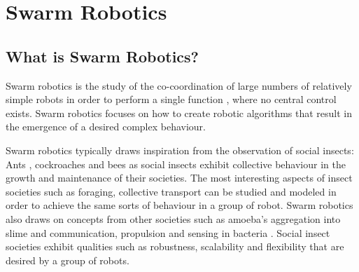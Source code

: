 
\chapter{Swarm Robotics}
\label{chap:first}





\section{What is Swarm Robotics?}
\label{sec:first:definitionswarmrobotics}

Swarm robotics is the study of the co-coordination of large numbers of relatively simple robots in order to perform a single function \cite{csahin2005swarm}, where no central control exists. Swarm robotics focuses on how to create robotic algorithms that result in the emergence of a desired complex behaviour.

Swarm robotics typically draws inspiration from the observation of social insects: Ants \cite{hoff2010two}, cockroaches \cite{garnier2005aggregation} and bees \cite{lee2012foraging} as social insects exhibit collective behaviour in the growth and maintenance of their societies\cite{wilson1971insect, bailishive}. The most interesting aspects of insect societies such as foraging, collective transport can be studied and modeled in order to achieve the same sorts of behaviour in a group of robot. Swarm robotics also draws on concepts from other societies such as amoeba's aggregation into slime \cite{schmickl2007navigation} and communication, propulsion and sensing in bacteria \cite{dhariwal2004bacterium,martel2010using}. Social insect societies exhibit qualities such as robustness, scalability and flexibility that are desired by a group of robots.

